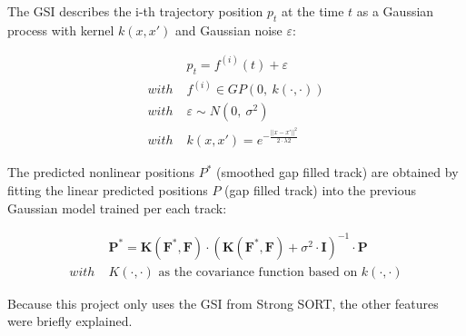 {
    The \ac{GSI} describes the i-th trajectory position $p_{t}$ at the time $t$ as a Gaussian process with kernel $k(x, x')$ and Gaussian noise $\varepsilon$:
}

\begin{equation}
    \label{eqn:gaussian trajectory}
    \begin{split}
        &p_{t} = f^{(i)}(t) + \varepsilon \\[0.25cm]
        with \;& f^{(i)} \in GP\left(0,\: k(\cdot,\cdot)\right) \\[0.25cm]
        with \;& \varepsilon \sim N\left(0,\: \sigma^{2}\right) \\[0.25cm]
        with \;& k(x, x') = e^{-\frac{||x - x'||^{2}}{2 \cdot \lambda{2}}}
    \end{split}
\end{equation}

\needspace{0.1\textheight}

{
    The predicted nonlinear positions $P^{*}$ (smoothed gap filled track) are obtained by fitting the linear predicted positions $P$ (gap filled track) into the previous Gaussian model trained per each track:
}


\begin{equation}
    \label{eqn:gaussian trajectory smoothing}
    \begin{split}
        &\mathbf{P^{*}} = \mathbf{K(F^{*}, F)} \cdot \left(\mathbf{K(F^{*}, F)} + \sigma^{2} \cdot \mathbf{I}\right)^{-1} \cdot \mathbf{P} \\[0.25cm]
        with \;& K(\cdot, \cdot) \text{ as the covariance function based on } k(\cdot, \cdot)
    \end{split}
\end{equation}


{
    Because this project only uses the \ac{GSI} from Strong SORT, the other features were briefly explained.
}

